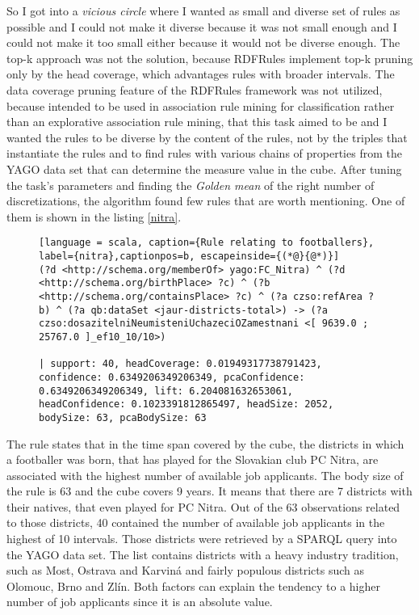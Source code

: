 So I got into a \textit{vicious circle} where I wanted as small and diverse set of rules as possible and I could not make it diverse because it was not small enough and I could not make it too small either because it would not be diverse enough. The top-k approach was not the solution, because RDFRules implement top-k pruning only by the head coverage, which advantages rules with broader intervals. The data coverage pruning feature of the RDFRules framework was not utilized, because intended to be used in association rule mining for classification\cite{Vanhoof2010} rather than an explorative association rule mining, that this task aimed to be and I wanted the rules to be diverse by the content of the rules, not by the triples that instantiate the rules and to find rules with various chains of properties from the YAGO data set that can determine the measure value in the cube. After tuning the task's parameters and finding the \textit{Golden mean} of the right number of discretizations, the algorithm found few rules that are worth mentioning. One of them is shown in the listing \ref{nitra}.

\begin{figure}[h]
\begin{lstlisting}[language = scala, caption={Rule relating to footballers}, label={nitra},captionpos=b, escapeinside={(*@}{@*)}]
(?d <http://schema.org/memberOf> yago:FC_Nitra) ^ (?d <http://schema.org/birthPlace> ?c) ^ (?b <http://schema.org/containsPlace> ?c) ^ (?a czso:refArea ?b) ^ (?a qb:dataSet <jaur-districts-total>) -> (?a czso:dosazitelniNeumisteniUchazeciOZamestnani <[ 9639.0 ; 25767.0 ]_ef10_10/10>) 

| support: 40, headCoverage: 0.01949317738791423, confidence: 0.6349206349206349, pcaConfidence: 0.6349206349206349, lift: 6.204081632653061, headConfidence: 0.1023391812865497, headSize: 2052, bodySize: 63, pcaBodySize: 63
\end{lstlisting}
\end{figure}

The rule states that in the time span covered by the cube, the districts in which a footballer was born, that has played for the Slovakian club PC Nitra, are associated with the highest number of available job applicants. The body size of the rule is 63 and the cube covers 9 years. It means that there are 7 districts with their natives, that even played for PC Nitra. Out of the 63 observations related to those districts, 40 contained the number of available job applicants in the highest of 10 intervals. Those districts were retrieved by a SPARQL query into the YAGO data set. The list contains districts with a heavy industry tradition, such as Most, Ostrava and Karviná and fairly populous districts such as Olomouc, Brno and Zlín. Both factors can explain the tendency to a higher number of job applicants since it is an absolute value.